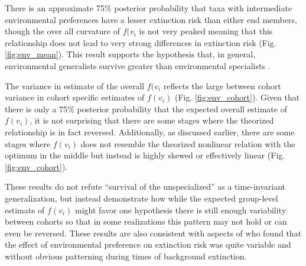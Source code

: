 \documentclass[12pt,letterpaper]{article}
\begin{document}
There is an approximate 75\% posterior probability that taxa with intermediate environmental preferences have a lesser extinction risk than either end members, though the over all curvature of \(f(v_{i}\) is not very peaked meaning that this relationship does not lead to very strong differences in extinction risk (Fig. \ref{fig:env_mean}). This result supports the hypothesis that, in general, environmental generalists survive greater than environmental specialists \citep{Simpson1944,Liow2004a,Liow2007b,Nurnberg2013a,Nurnberg2015}.

The variance in estimate of the overall \(f(v_{i}\) reflects the large between cohort variance in cohort specific estimates of \(f(v_{i})\) (Fig. \ref{fig:env_cohort}). Given that there is only a 75\% posterior probability that the expected overall estimate of \(f(v_{i})\), it is not surprising that there are some stages where the theorized relationship is in fact reversed. Additionally, as discussed earlier, there are some stages where \(f(v_{i})\) does not resemble the theorized nonlinear relation with the optimum in the middle but instead is highly skewed or effectively linear (Fig. \ref{fig:env_cohort}). 

These results do not refute ``survival of the unspecialized'' as a time-invariant generalization, but instead demonstrate how while the expected group-level estimate of \(f(v_{i})\) might favor one hypothesis there is still enough variability between cohorts so that in some realizations this pattern may not hold or can even be reversed. These results are also consistent with aspects of \citep{Miller2009a} who found that the effect of environmental preference on extinction risk was quite variable and without obvious patterning during times of background extinction.



\end{document}
